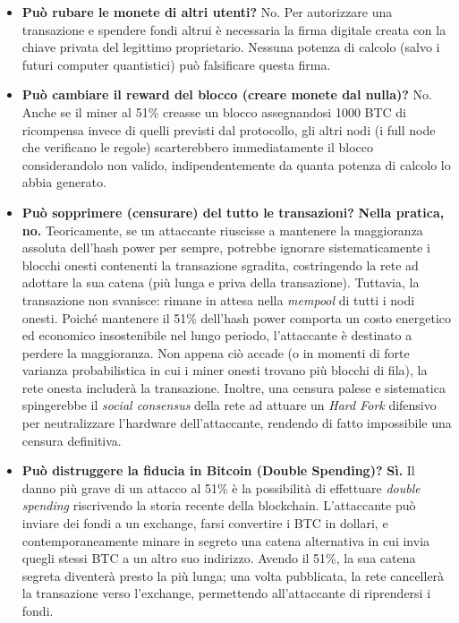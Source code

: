 \begin{itemize}
    \item \textbf{Può rubare le monete di altri utenti?} No. Per autorizzare una transazione e spendere fondi altrui è necessaria la firma digitale creata con la chiave privata del legittimo proprietario. Nessuna potenza di calcolo (salvo i futuri computer quantistici) può falsificare questa firma.
    
    \item \textbf{Può cambiare il reward del blocco (creare monete dal nulla)?} No. Anche se il miner al 51\% creasse un blocco assegnandosi 1000 BTC di ricompensa invece di quelli previsti dal protocollo, gli altri nodi (i full node che verificano le regole) scarterebbero immediatamente il blocco considerandolo non valido, indipendentemente da quanta potenza di calcolo lo abbia generato.
    
    \item \textbf{Può sopprimere (censurare) del tutto le transazioni?} \textbf{Nella pratica, no.} Teoricamente, se un attaccante riuscisse a mantenere la maggioranza assoluta dell'hash power per sempre, potrebbe ignorare sistematicamente i blocchi onesti contenenti la transazione sgradita, costringendo la rete ad adottare la sua catena (più lunga e priva della transazione). 
    Tuttavia, la transazione non svanisce: rimane in attesa nella \textit{mempool} di tutti i nodi onesti. Poiché mantenere il 51\% dell'hash power comporta un costo energetico ed economico insostenibile nel lungo periodo, l'attaccante è destinato a perdere la maggioranza. Non appena ciò accade (o in momenti di forte varianza probabilistica in cui i miner onesti trovano più blocchi di fila), la rete onesta includerà la transazione. Inoltre, una censura palese e sistematica spingerebbe il \textit{social consensus} della rete ad attuare un \textit{Hard Fork} difensivo per neutralizzare l'hardware dell'attaccante, rendendo di fatto impossibile una censura definitiva.
    \item \textbf{Può distruggere la fiducia in Bitcoin (Double Spending)?} \textbf{Sì.} Il danno più grave di un attacco al 51\% è la possibilità di effettuare \textit{double spending} riscrivendo la storia recente della blockchain. L'attaccante può inviare dei fondi a un exchange, farsi convertire i BTC in dollari, e contemporaneamente minare in segreto una catena alternativa in cui invia quegli stessi BTC a un altro suo indirizzo. Avendo il 51\%, la sua catena segreta diventerà presto la più lunga; una volta pubblicata, la rete cancellerà la transazione verso l'exchange, permettendo all'attaccante di riprendersi i fondi.
\end{itemize}

